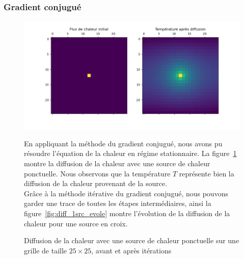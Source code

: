 \documentclass{article}
\begin{document}
\subsubsection{Gradient conjugué}
\begin{figure}[H]
  \begin{minipage}{0.5\textwidth}
    \includegraphics[width=\textwidth]{img/diff_1src.png}
    \caption{Diffusion de la chaleur avec une source de chaleur ponctuelle sur une grille de taille \(25 \times 25\), avant et après itérations}
    \label{fig:diff_1src}
  \end{minipage}
  \hfill
  \begin{minipage}{0.45\textwidth}
    En appliquant la méthode du gradient conjugué, nous avons pu résoudre l'équation de la chaleur en régime stationnaire. La figure~\ref{fig:diff_1src} montre la diffusion de la chaleur avec une source de chaleur ponctuelle. Nous observons que la température \(T\) représente bien la diffusion de la chaleur provenant de la source.\\
    Grâce à la méthode itérative du gradient conjugué, nous pouvons garder une trace de toutes les étapes intermédiaires, ainsi la figure~\ref{fig:diff_1src_evole} montre l'évolution de la diffusion de la chaleur pour une source en croix. 
  \end{minipage}
\end{figure}
\end{document}
